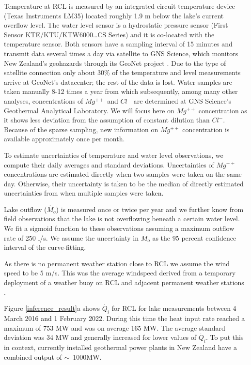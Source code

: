 \documentclass[doublespacing, linenumbers]{bmcart}
\begin{document}
Temperature at RCL is measured by an integrated-circuit temperature device
(Texas Instruments LM35) located roughly 1.9 m below the lake's current overflow
level. The water level sensor is a hydrostatic pressure sensor (First Sensor
KTE/KTU/KTW6000\ldots CS Series) and it is co-located with the temperature
sensor. Both sensors have a sampling interval of 15 minutes and transmit data
several times a day via satellite to GNS Science, which monitors New Zealand's
geohazards through its GeoNet project \cite{GeoNetHome}. Due to the type of
satellite connection only about 30\% of the temperature and level measurements
arrive at GeoNet's datacenter; the rest of the data is lost. Water samples are
taken manually 8-12 times a year from which subsequently, among many other
analyses, concentrations of $Mg^{++}$ and $Cl^-$ are determined at GNS Science's
Geothermal Analytical Laboratory. We will focus here on $Mg^{++}$ concentration
as it shows less deviation from the assumption of constant dilution than $Cl^-$.
Because of the sparse sampling, new information on $Mg^{++}$ concentration is
available approximately once per month.
 
To estimate uncertainties of temperature and water level observations, we 
compute their daily averages and standard deviations. Uncertainties of $Mg^{++}$
concentrations are estimated directly when two samples were taken on the same day.
Otherwise, their uncertainty is taken to be the median of directly estimated
uncertainties from when multiple samples were taken. 

Lake outflow ($\dot{M_o}$) is measured once or twice per year and we further
know from field observations that the lake is not overflowing beneath a certain
water level. We fit a sigmoid function to these observations assuming a maximum
outflow rate of 250 l/s. We assume the uncertainty in $\dot{M_o}$ as the 95
percent confidence interval of the curve-fitting.

As there is no permanent weather station close to RCL we assume the wind speed
to be 5 m/s. This was the average windspeed derived from a temporary deployment
of a weather buoy on RCL and adjacent permanent weather stations
\cite{hurstUseWeatherBuoy2012}.

Figure \ref{inference_result}a shows $\dot{Q_i}$ for RCL for lake measurements
between 4 March 2016 and 1 February 2022. During this time the heat input rate
reached a maximum of 753 MW and was on average 165 MW. The average standard
deviation was 34 MW and generally increased for lower values of $\dot{Q_i}$. To
put this in context, currently installed geothermal power plants in New Zealand
have a combined output of $\sim$~1000MW.
\end{document}
